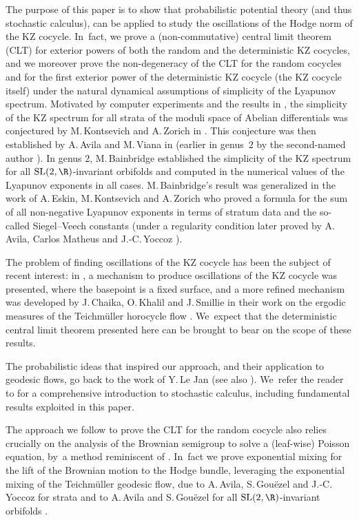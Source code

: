 \documentclass[10pt]{amsart}
\theoremstyle{plain}
\theoremstyle{definition}
\numberwithin{equation}{subsection}
\newcommand{\SL}{\mathrm{SL}}
\newcommand{\Tm}{Teichmüller\xspace}
\begin{document}
The purpose of this paper is to show that probabilistic potential theory (and thus stochastic calculus), can be applied to study the oscillations of the Hodge norm of the KZ cocycle. In~fact, we prove a (non-commutative) central limit theorem (CLT) for exterior powers of both the random and the deterministic KZ cocycles, and we moreover prove the non-degeneracy of the CLT for the random cocycles and for the first exterior power of the deterministic KZ cocycle (the KZ cocycle itself) under the natural dynamical assumptions of simplicity of the Lyapunov spectrum. Motivated by computer experiments and the results in \cite{Z96, Z97}, the simplicity of the KZ spectrum for all strata of the moduli space of Abelian differentials was conjectured by M.\,Kontsevich and A.\,Zorich in \cite{KZ97, Kon97}. This conjecture was then established by A.\,Avila and M.\,Viana in \cite{AV07} (earlier in genus~$2$ by the second-named author \cite{For02}). In genus $2$, M.\,Bainbridge established the simplicity of the KZ spectrum for all $\SL(2,\R)$-invariant orbifolds and computed in \cite{B07} the numerical values of the Lyapunov exponents in all cases. M.\,Bainbridge's result was generalized in the work of A.\,Eskin, M.\,Kontsevich and A.\,Zorich \cite{EKZ14} who proved a formula for the sum of all non-negative Lyapunov exponents in terms of stratum data and the so-called Siegel--Veech constants (under a regularity condition later proved by A.\,Avila,
Carlos Matheus and J.\nobreakdash-C.\,Yoccoz \cite{AMY13}).

The problem of finding oscillations of the KZ cocycle has been the subject of recent interest: in \cite{A21}, a mechanism to produce oscillations of the KZ cocycle was presented, where the basepoint is a fixed surface, and a more refined mechanism was developed by J.\,Chaika, O.\,Khalil and J.\,Smillie in their work on the ergodic measures of the \Tm horocycle flow \cite{CKS21}. We~expect that the deterministic central limit theorem presented here can be brought to bear on the scope of these results.

The probabilistic ideas that inspired our approach, and their application to geodesic flows, go back to the work of Y.\,Le Jan \cite{L94} (see also \cite{FL12}). We~refer the reader to \cite{RY} for a comprehensive introduction to stochastic calculus, including fundamental results exploited in this paper.

The approach we follow to prove the CLT for the random cocycle also relies crucially on the analysis of the Brownian semigroup to solve a (leaf-wise) Poisson equation, by~a method reminiscent of \cite{L95}. In~fact we prove exponential mixing for the lift of the Brownian motion to the Hodge bundle, leveraging the exponential mixing of the \Tm geodesic flow, due to A.\,Avila, S.\,Gouëzel and J.-C.\,Yoccoz for strata \cite{AGY06} and to A.\,Avila and S.\,Gouëzel for all $\SL(2,\R)$-invariant orbifolds \cite{AG13}.
\end{document}
